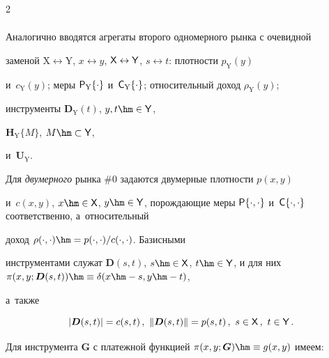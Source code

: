 \begin{multicols}{2}
\begin{align*}
  \end{align*}


  


  Аналогично вводятся агрегаты второго одномерного рынка с очевидной 


заменой $\mathrm{X}\leftrightarrow\mathrm{Y}$, $x\leftrightarrow y$, ${\sf 


X}\leftrightarrow {\sf Y}$, $s\leftrightarrow t$: плотности $p_{\mathrm{Y}}(y)$ 


и~$c_{\mathrm{Y}}(y)$; меры ${\sf P}_{\mathrm{Y}}\{\cdot\}$ и~${\sf 


C}_{\mathrm{Y}}\{\cdot\}$; относительный доход $\rho_{\mathrm{Y}}(y)$; 


инструменты $\boldsymbol{D}_{\mathrm{Y}}(t)$, $y, t \hm\in {\sf Y}$, 


$\boldsymbol{H}_{\mathrm{Y}}\{M\}$, $M \hm\subset {\sf Y}$, 


и~$\boldsymbol{U}_{\mathrm{Y}}$.


  


  Для \textit{двумерного} рынка \#0 задаются двумерные плотности $p(x, y)$ 


и~$c(x, y)$, $x \hm\in {\sf  X}$, $y \hm\in {\sf  Y}$, по\-рож\-да\-ющие меры ${\sf 


P}\{\cdot,\cdot\}$ и~${\sf  C}\{\cdot,\cdot\}$ соответственно, а~относительный 


доход $\rho(\cdot,\cdot)\hm = p(\cdot,\cdot)/c(\cdot,\cdot)$. Базисными 


инструментами служат $\boldsymbol{D}(s, t)$, $s \hm\in{\sf X}$, $t\hm\in{\sf  


Y}$, и для них $\pi(x, y; \boldsymbol{D}(s, t))\hm\equiv \delta(x \hm- s, y \hm- t)$, 


а~также 


  $$


  \left\vert \boldsymbol{D}(s,t)\right\vert =c(s,t)\,,\enskip\!


  \left\| \boldsymbol{D}(s,t)\right\| =p(s,t)\,,\enskip\!


  s\in {\sf X}\,,\ t\in {\sf Y}\,.


  $$


  


  Для инструмента $\boldsymbol{G}$ с платежной функцией $\pi(x, y; 


\boldsymbol{G}) \hm\equiv g(x, y)$ имеем: 






\end{multicols}
